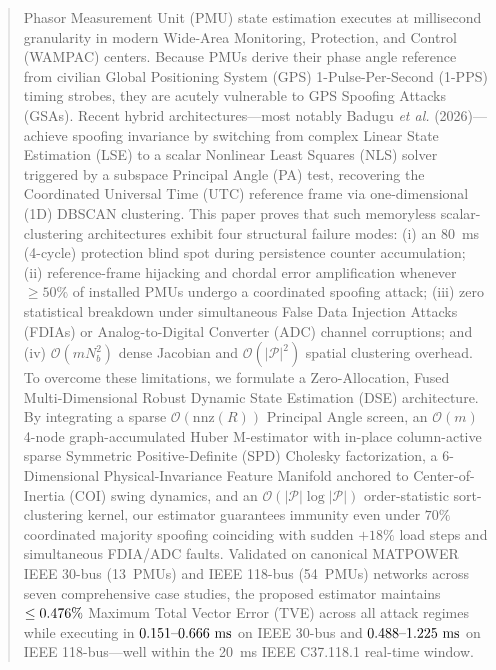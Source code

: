 \documentclass[journal,twoside]{IEEEtran}
\begin{document}
\begin{abstract}
Phasor Measurement Unit (PMU) state estimation executes at millisecond granularity in modern Wide-Area Monitoring, Protection, and Control (WAMPAC) centers. Because PMUs derive their phase angle reference from civilian Global Positioning System (GPS) 1-Pulse-Per-Second (1-PPS) timing strobes, they are acutely vulnerable to GPS Spoofing Attacks (GSAs). Recent hybrid architectures---most notably Badugu \emph{et al.} (2026)---achieve spoofing invariance by switching from complex Linear State Estimation (LSE) to a scalar Nonlinear Least Squares (NLS) solver triggered by a subspace Principal Angle (PA) test, recovering the Coordinated Universal Time (UTC) reference frame via one-dimensional (1D) DBSCAN clustering. This paper proves that such memoryless scalar-clustering architectures exhibit four structural failure modes: (i) an 80~ms (4-cycle) protection blind spot during persistence counter accumulation; (ii) reference-frame hijacking and chordal error amplification whenever $\ge 50\%$ of installed PMUs undergo a coordinated spoofing attack; (iii) zero statistical breakdown under simultaneous False Data Injection Attacks (FDIAs) or Analog-to-Digital Converter (ADC) channel corruptions; and (iv) $\mathcal{O}(m N_b^2)$ dense Jacobian and $\mathcal{O}(|\mathcal{P}|^2)$ spatial clustering overhead. To overcome these limitations, we formulate a Zero-Allocation, Fused Multi-Dimensional Robust Dynamic State Estimation (DSE) architecture. By integrating a sparse $\mathcal{O}(\mathrm{nnz}(R))$ Principal Angle screen, an $\mathcal{O}(m)$ 4-node graph-accumulated Huber M-estimator with in-place column-active sparse Symmetric Positive-Definite (SPD) Cholesky factorization, a 6-Dimensional Physical-Invariance Feature Manifold anchored to Center-of-Inertia (COI) swing dynamics, and an $\mathcal{O}(|\mathcal{P}|\log|\mathcal{P}|)$ order-statistic sort-clustering kernel, our estimator guarantees immunity even under $70\%$ coordinated majority spoofing coinciding with sudden $+18\%$ load steps and simultaneous FDIA/ADC faults. Validated on canonical MATPOWER IEEE 30-bus (13~PMUs) and IEEE 118-bus (54~PMUs) networks across seven comprehensive case studies, the proposed estimator maintains $\le \MaxTVEThirty$ Maximum Total Vector Error (TVE) across all attack regimes while executing in $\MinTimeThirty\text{--}\MaxTimeThirty\text{ ms}$ on IEEE 30-bus and $\MinTimeOneEighteen\text{--}\MaxTimeOneEighteen\text{ ms}$ on IEEE 118-bus---well within the 20~ms IEEE C37.118.1 real-time window.
\end{abstract}
\end{document}
